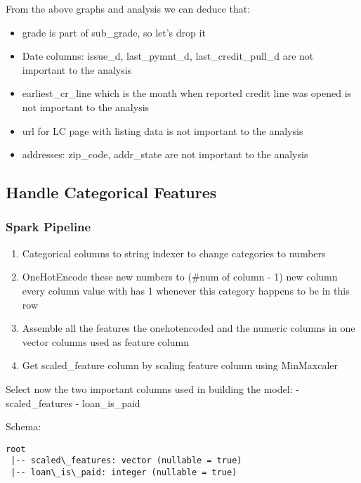 \documentclass[11pt]{article}
\providecommand{\tightlist}{%
      \setlength{\itemsep}{0pt}\setlength{\parskip}{0pt}}
\begin{document}
    From the above graphs and analysis we can deduce that:

\begin{itemize}
\item
  grade is part of sub\_grade, so let's drop it
\item
  Date columns: issue\_d, last\_pymnt\_d, last\_credit\_pull\_d are not
  important to the analysis
\item
  earliest\_cr\_line which is the month when reported credit line was
  opened is not important to the analysis
\item
  url for LC page with listing data is not important to the analysis
\item
  addresses: zip\_code, addr\_state are not important to the analysis
\end{itemize}

    \hypertarget{handle-categorical-features}{%
\subsection{Handle Categorical
Features}\label{handle-categorical-features}}

    \hypertarget{spark-pipeline}{%
\subsubsection{Spark Pipeline}\label{spark-pipeline}}

\begin{enumerate}
\def\labelenumi{\arabic{enumi}.}
\tightlist
\item
  Categorical columns to string indexer to change categories to numbers
\item
  OneHotEncode these new numbers to (\#num of column - 1) new column
  every column value with has 1 whenever this category happens to be in
  this row
\item
  Assemble all the features the onehotencoded and the numeric columns in
  one vector columns used as feature column
\item
  Get scaled\_feature column by scaling feature column using MinMaxcaler
\end{enumerate}

    Select now the two important columns used in building the model: -
scaled\_features - loan\_is\_paid

    Schema:

    \begin{Verbatim}[commandchars=\\\{\}]
root
 |-- scaled\_features: vector (nullable = true)
 |-- loan\_is\_paid: integer (nullable = true)

    \end{Verbatim}
\end{document}
